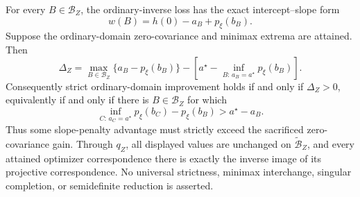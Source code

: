 For every \(B\in\mathcal B_Z\), the ordinary-inverse loss has the exact intercept--slope form
\[
w(B)=h(0)-a_B+p_\xi(b_B).
\]
Suppose the ordinary-domain zero-covariance and minimax extrema are attained.  Then
\[
\Delta_Z=
\max_{B\in\mathcal B_Z}\{a_B-p_\xi(b_B)\}
-\left[a^\star-\inf_{B:\,a_B=a^\star}p_\xi(b_B)\right].
\]
Consequently strict ordinary-domain improvement holds if and only if \(\Delta_Z>0\), equivalently if and only if there is \(B\in\mathcal B_Z\) for which
\[
\inf_{C:\,a_C=a^\star}p_\xi(b_C)-p_\xi(b_B)
>a^\star-a_B.
\]
Thus some slope-penalty advantage must strictly exceed the sacrificed zero-covariance gain.  Through \(q_Z\), all displayed values are unchanged on \(\widetilde{\mathcal B}_Z\), and every attained optimizer correspondence there is exactly the inverse image of its projective correspondence.  No universal strictness, minimax interchange, singular completion, or semidefinite reduction is asserted.